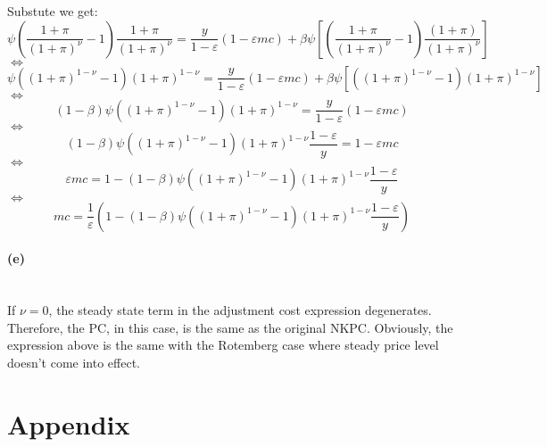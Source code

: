 \documentclass{article}
\begin{document}
Substute we get:
\begin{equation*}
    \psi\left(\dfrac{1+\pi}{\left(1+\pi\right)^{\nu}}-1\right)\dfrac{1+\pi}{\left(1+\pi\right)^{\nu}}=\frac{y}{1-\varepsilon}\left(1-\varepsilon mc\right)+\beta\psi\left[\left(\dfrac{1+\pi}{\left(1+\pi\right)^{\nu}}-1\right)\dfrac{\left(1+\pi\right)}{\left(1+\pi\right)^{\nu}}\right]
\end{equation*}
$\iff$
\begin{equation*}
    \psi\left(\left(1+\pi\right)^{1-\nu}-1\right)\left(1+\pi\right)^{1-\nu}=\frac{y}{1-\varepsilon}\left(1-\varepsilon mc\right)+\beta\psi\left[\left(\left(1+\pi\right)^{1-\nu}-1\right)\left(1+\pi\right)^{1-\nu}\right]
\end{equation*}
$\iff$
\begin{equation*}
    \left(1-\beta\right)\psi\left(\left(1+\pi\right)^{1-\nu}-1\right)\left(1+\pi\right)^{1-\nu}=\frac{y}{1-\varepsilon}\left(1-\varepsilon mc\right)
\end{equation*}
$\iff$
\begin{equation*}
    \left(1-\beta\right)\psi\left(\left(1+\pi\right)^{1-\nu}-1\right)\left(1+\pi\right)^{1-\nu}\dfrac{1-\varepsilon}{y}=1-\varepsilon mc
\end{equation*}
$\iff$
\begin{equation*}
    \varepsilon mc=1-\left(1-\beta\right)\psi\left(\left(1+\pi\right)^{1-\nu}-1\right)\left(1+\pi\right)^{1-\nu}\dfrac{1-\varepsilon}{y}
\end{equation*}
$\iff$
\begin{equation*}
    mc=\dfrac{1}{\varepsilon}\left(1-\left(1-\beta\right)\psi\left(\left(1+\pi\right)^{1-\nu}-1\right)\left(1+\pi\right)^{1-\nu}\dfrac{1-\varepsilon}{y}\right)
\end{equation*}


\paragraph*{(e)}\mbox{}\\

If $\nu=0$, the steady state term in the adjustment cost expression degenerates. Therefore, the PC, in this case, is the same as the original NKPC. Obviously, the expression above is the same with the Rotemberg case where steady price level doesn't come into effect.

\section*{\textbf{Appendix}} 
\end{document}
